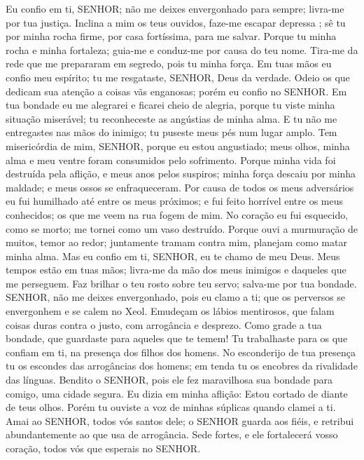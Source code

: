 {\PP 
  Eu confio em ti, SENHOR; não me deixes envergonhado para sempre; livra-me por tua justiça.
  Inclina a mim os teus ouvidos, faze-me escapar depressa
{} ; sê tu por minha rocha firme, por casa fortíssima, para me salvar.
  Porque tu
{} minha rocha e minha fortaleza; guia-me e conduz-me por causa do teu nome.
  Tira-me da rede que me prepararam em segredo, pois tu
{} minha força.
  Em tuas mãos eu confio meu espírito; tu me resgataste, SENHOR, Deus da verdade.
  Odeio os que dedicam sua atenção a coisas vãs
{} enganosas; porém eu confio no SENHOR.
  Em tua bondade eu me alegrarei e ficarei cheio de alegria, porque tu viste minha situação miserável; tu reconheceste as angústias de minha alma.
  E tu não me entregastes nas mãos do
{} inimigo; tu puseste meus pés num lugar amplo.
  Tem misericórdia de mim, SENHOR, porque eu estou angustiado; meus olhos, minha alma e meu ventre foram consumidos pelo sofrimento.
  Porque minha vida foi destruída pela aflição, e meus anos pelos suspiros; minha força descaiu por minha maldade; e meus ossos se enfraqueceram.
  Por causa de todos os meus adversários eu fui humilhado até entre os meus próximos; e fui feito horrível entre os meus conhecidos; os que me veem na rua fogem de mim.
  No coração
{} eu fui esquecido, como se
{} morto; me tornei como um vaso destruído.
  Porque ouvi a murmuração de muitos, temor
{} ao redor; juntamente tramam contra mim, planejam como matar minha alma.
  Mas eu confio em ti, SENHOR, eu te chamo de meu Deus.
  Meus tempos estão em tuas mãos; livra-me da mão dos meus inimigos e daqueles que me perseguem.
  Faz brilhar o teu rosto sobre teu servo; salva-me por tua bondade.
  SENHOR, não me deixes envergonhado, pois eu clamo a ti; que os perversos se envergonhem e se calem no Xeol.
  Emudeçam os lábios mentirosos, que falam coisas duras contra o justo, com arrogância e desprezo.
  Como
{} grade a tua bondade, que guardaste para aqueles que te temem! Tu trabalhaste para os que confiam em ti, na presença dos filhos dos homens.
  No esconderijo de tua presença tu os escondes das arrogâncias dos homens; em
{} tenda tu os encobres da rivalidade das línguas.
  Bendito
{} o SENHOR, pois ele fez maravilhosa sua bondade para comigo,
{} uma cidade segura.
  Eu dizia em minha aflição: Estou cortado de diante de teus olhos. Porém tu ouviste a voz de minhas súplicas quando clamei a ti.
  Amai ao SENHOR, todos vós santos dele; o SENHOR guarda aos fiéis, e retribui abundantemente ao que usa de arrogância.
  Sede fortes, e ele fortalecerá vosso coração, todos vós que esperais no SENHOR.
\par }

